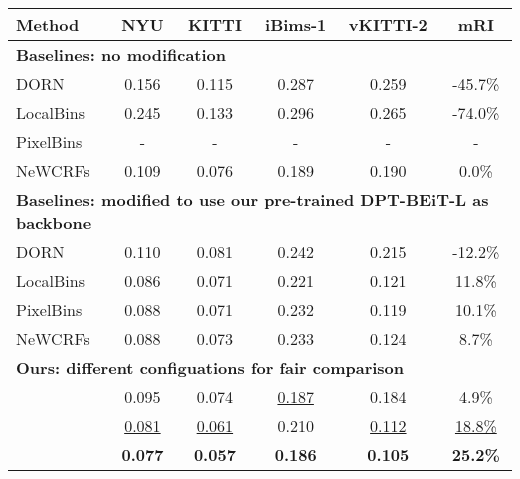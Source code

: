 \documentclass[10pt,twocolumn,letterpaper]{article}
\newcommand{\nomod}[1]{{#1}}
\newcommand{\modified}[1]{{#1}}
\begin{document}
\begin{table}[bt]
    \centering
    \setlength{\tabcolsep}{4pt} \footnotesize
    \begin{tabular}{@{}lcccc|c@{}}
    \toprule
    \textbf{Method}           & \textbf{NYU}              & \textbf{KITTI}      & \textbf{iBims-1}                     & \textbf{vKITTI-2} & \textbf{mRI} \\ 
    \midrule
    \multicolumn{6}{l}{\textbf{Baselines: no modification}} \\\midrule
    \nomod{DORN}        &    0.156             &    0.115       &           0.287                &    0.259           &   -45.7\%          \\
    \nomod{LocalBins}   &   0.245   &   0.133       &        0.296                   &         0.265               &  -74.0\%  \\
    \nomod{PixelBins}   &      -           &    -    &         -                   &         -           &    -    \\
    \nomod{NeWCRFs}     &  0.109   &    0.076       &     {0.189}                      &    0.190     & 0.0\%                 \\
    \midrule
    \multicolumn{6}{l}{\textbf{Baselines: modified to use our pre-trained DPT-BEiT-L as backbone}} \\\midrule
    \modified{DORN}        & 0.110                 & 0.081          & 0.242                           & 0.215               &    -12.2\%         \\
    \modified{LocalBins}   & {0.086}     & {0.071}          & {0.221}                           & 0.121                        & 11.8\%   \\
    \modified{PixelBins}   & 0.088                 & {0.071}          & 0.232                           & {0.119}                    &   10.1\%     \\
    \modified{NeWCRFs}     & 0.088          & 0.073          & 0.233                           & 0.124           &  8.7\%              \\
    \midrule
    \multicolumn{6}{l}{\textbf{Ours: different configuations for fair comparison}} \\\midrule
    {}        &   0.095      &    0.074      &          \underline{0.187}                 & 0.184 & 4.9\%\\
    {}        & \underline{0.081}        & \underline{0.061}         & {0.210}                          & \underline{0.112} & \underline{18.8\%} \\   
    \textbf{}        & \textbf{0.077}        & \textbf{0.057}         & \textbf{0.186}                          & \textbf{0.105} & \textbf{25.2\%} \\ 

\end{tabular}
\end{table}
\end{document}

